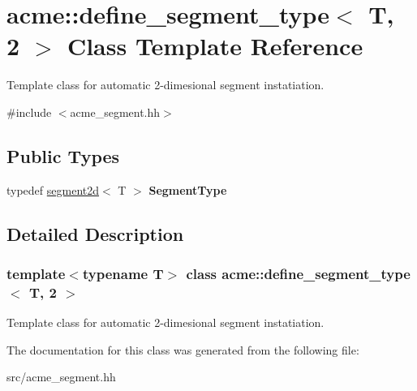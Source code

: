 \hypertarget{classacme_1_1define__segment__type_3_01_t_00_012_01_4}{}\section{acme\+:\+:define\+\_\+segment\+\_\+type$<$ T, 2 $>$ Class Template Reference}
\label{classacme_1_1define__segment__type_3_01_t_00_012_01_4}


Template class for automatic 2-\/dimesional segment instatiation.  




{\ttfamily \#include $<$acme\+\_\+segment.\+hh$>$}

\subsection*{Public Types}
\begin{DoxyCompactItemize}
\item 
\mbox{\label{classacme_1_1define__segment__type_3_01_t_00_012_01_4_a7c9260f2127fa77fdca60463f6b984f8}} 
typedef \hyperlink{classacme_1_1segment2d}{segment2d}$<$ T $>$ {\bfseries Segment\+Type}
\end{DoxyCompactItemize}


\subsection{Detailed Description}
\subsubsection*{template$<$typename T$>$\newline
class acme\+::define\+\_\+segment\+\_\+type$<$ T, 2 $>$}

Template class for automatic 2-\/dimesional segment instatiation. 

The documentation for this class was generated from the following file\+:\begin{DoxyCompactItemize}
\item 
src/acme\+\_\+segment.\+hh\end{DoxyCompactItemize}
